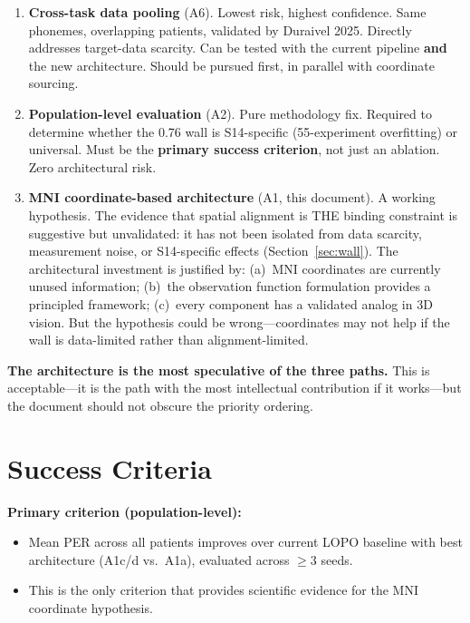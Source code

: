\documentclass[11pt,letterpaper]{article}
\begin{document}
\begin{enumerate}[leftmargin=2em]
\item \textbf{Cross-task data pooling} (A6). Lowest risk, highest confidence. Same phonemes, overlapping patients, validated by Duraivel 2025. Directly addresses target-data scarcity. Can be tested with the current pipeline \textbf{and} the new architecture. Should be pursued first, in parallel with coordinate sourcing.

\item \textbf{Population-level evaluation} (A2). Pure methodology fix. Required to determine whether the 0.76 wall is S14-specific (55-experiment overfitting) or universal. Must be the \textbf{primary success criterion}, not just an ablation. Zero architectural risk.

\item \textbf{MNI coordinate-based architecture} (A1, this document). A working hypothesis. The evidence that spatial alignment is THE binding constraint is suggestive but unvalidated: it has not been isolated from data scarcity, measurement noise, or S14-specific effects (Section~\ref{sec:wall}). The architectural investment is justified by: (a)~MNI coordinates are currently unused information; (b)~the observation function formulation provides a principled framework; (c)~every component has a validated analog in 3D vision. But the hypothesis could be wrong---coordinates may not help if the wall is data-limited rather than alignment-limited.
\end{enumerate}

\textbf{The architecture is the most speculative of the three paths.} This is acceptable---it is the path with the most intellectual contribution if it works---but the document should not obscure the priority ordering.


\section{Success Criteria}\label{sec:success}

\textbf{Primary criterion (population-level):}
\begin{itemize}[leftmargin=2em]
\item Mean PER across all patients improves over current LOPO baseline with best architecture (A1c/d vs.\ A1a), evaluated across ${\geq}3$ seeds.
\item This is the only criterion that provides scientific evidence for the MNI coordinate hypothesis.
\end{itemize}
\end{document}
